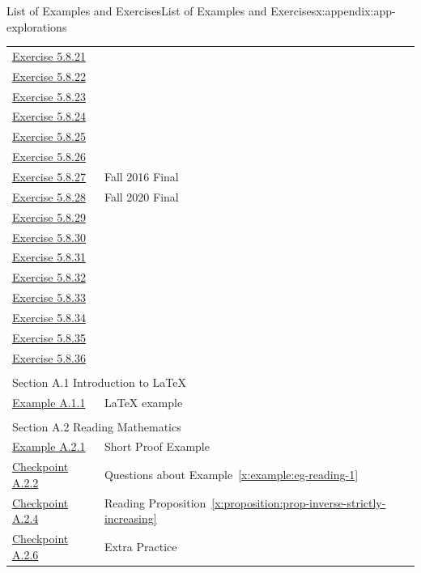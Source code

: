 \documentclass[oneside,10pt,]{book}
\newcommand{\xreffont}{\relax}
\numberwithin{equation}{section}
\begin{document}
\begin{appendixptx}{List of Examples and Exercises}{}{List of Examples and Exercises}{}{}{x:appendix:app-explorations}
\begin{longtable}[l]{ll}
\hyperlink{g:exercise:id552000}{Exercise 5.8.21}& \\
\hyperlink{g:exercise:id552014}{Exercise 5.8.22}& \\
\hyperlink{x:exercise:ex-path-transitive}{Exercise 5.8.23}& \\
\hyperlink{x:exercise:ex-connectedness-relation}{Exercise 5.8.24}& \\
\hyperlink{g:exercise:id552080}{Exercise 5.8.25}& \\
\hyperlink{g:exercise:id552131}{Exercise 5.8.26}& \\
\hyperlink{x:exercise:ex-deg-connected}{Exercise 5.8.27}& Fall 2016 Final\\
\hyperlink{g:exercise:id552160}{Exercise 5.8.28}& Fall 2020 Final\\
\hyperlink{g:exercise:id552203}{Exercise 5.8.29}& \\
\hyperlink{g:exercise:id552236}{Exercise 5.8.30}& \\
\hyperlink{g:exercise:id552209}{Exercise 5.8.31}& \\
\hyperlink{x:exercise:ex-hamiltonian-kmn}{Exercise 5.8.32}& \\
\hyperlink{g:exercise:id552251}{Exercise 5.8.33}& \\
\hyperlink{g:exercise:id552254}{Exercise 5.8.34}& \\
\hyperlink{g:exercise:id552269}{Exercise 5.8.35}& \\
\hyperlink{g:exercise:id552356}{Exercise 5.8.36}& \\
\multicolumn{2}{l}{\null}\\[1.5ex] \multicolumn{2}{l}{\large Section A.1 Introduction to \LaTeX{}}\\[0.5ex]
\hyperref[x:example:eg-latex]{Example A.1.1}& \LaTeX{} example\\
\multicolumn{2}{l}{\null}\\[1.5ex] \multicolumn{2}{l}{\large Section A.2 Reading Mathematics}\\[0.5ex]
\hyperref[x:example:eg-reading-1]{Example A.2.1}& Short Proof Example\\
\hyperref[x:exercise:ex-reading-1]{Checkpoint A.2.2}& Questions about Example~{\xreffont\ref*{x:example:eg-reading-1}}\\
\hyperref[x:exercise:ex-reading-2]{Checkpoint A.2.4}& Reading Proposition~{\xreffont\ref*{x:proposition:prop-inverse-strictly-increasing}}\\
\hyperref[x:exercise:ex-reading-3]{Checkpoint A.2.6}& Extra Practice\\

\end{longtable}
\end{appendixptx}
\end{document}
